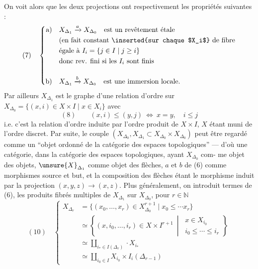 On voit alors que les deux projections
ont respectivement les propriétés suivantes :
\[
(7)\quad\left\{\begin{aligned}
\text{a)}\quad &X_{\Delta_1}\xrightarrow{a}X_{\Delta_0}\quad\text{est un revêtement étale}\\
&\text{(en fait constant \inserted{sur chaque $X_i$} de fibre}\\
&\text{égale à }I_i=\{j\in I\mid j\geq i\}\\
&\text{donc rev. fini si les }I_i\text{ sont finis}\\[1em]
\text{b)}\quad &X_{\Delta_1}\xrightarrow{b}X_{\Delta_0}\quad\text{est une immersion locale.}
\end{aligned}\right.
\]
Par ailleurs $X_{\Delta_1}$ est le graphe d'une relation
d'ordre sur $X_{\Delta_0}=\{(x,i)\in X\times I\mid x\in X_i\}$
avec
\[
(8)\qquad (x,i)\leq(y,j)\ \Longleftrightarrow\ x=y,\quad i\leq j
\]
i.e. c'est la relation d'ordre induite par
l'ordre produit de $X\times I$, $X$ étant muni
de l'ordre discret. Par suite, le
couple $(X_{\Delta_0},X_{\Delta_1}\subset X_{\Delta_0}\times X_{\Delta_0})$ peut
être regardé comme un ``objet ordonné de
la catégorie des espaces topologiques'' ---
d'où une catégorie, dans la catégorie
des espaces topologiques, ayant $X_{\Delta_0}$ com-
me objet des objets, $\unsure{X}_{\Delta_1}$ comme objet
des flèches, $a$ et $b$ de (6) comme
morphismes source et but, et la
composition des flèches étant le
morphisme
induit par la projection $(x,y,z)\longrightarrow(x,z)$.
Plus généralement, on introduit 
termes de (6), les produits fibrés
multiples de $X_{\Delta_1}$ sur $X_{\Delta_0}$, pour $r\in\mathbb N$
\[
(10)\quad\left\{\begin{aligned}
X_{\Delta_r}&=\{(x_0,\ldots,x_r)\in X_{\Delta_0}^{r+1}\mid x_0\leq\cdots x_r\}\\
&\simeq\left\{(x,i_0,\ldots,i_r)\in X\times I^{r+1}\ \middle|\ \begin{matrix}x\in X_{i_0}\\i_0\leq\cdots\leq i_r\end{matrix}\right\}\\
&\simeq\coprod_{i_*\in I(\Delta_r)}\cdot X_{i_*}\\
&\simeq\coprod_{i_0\in I}X_{i_0}\times I_i(\Delta_{r-1})
\end{aligned}\right.
\]
